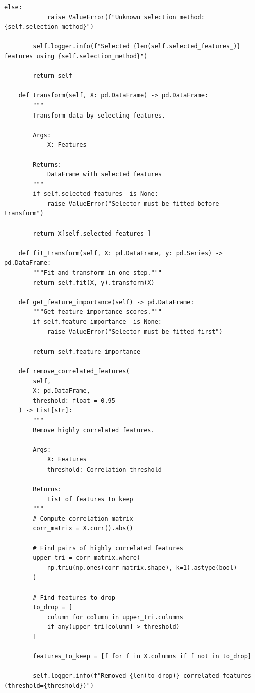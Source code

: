 \begin{lstlisting}[style=python, caption={Comprehensive Feature Selection Framework}]
        else:
            raise ValueError(f"Unknown selection method: {self.selection_method}")

        self.logger.info(f"Selected {len(self.selected_features_)} features using {self.selection_method}")

        return self

    def transform(self, X: pd.DataFrame) -> pd.DataFrame:
        """
        Transform data by selecting features.

        Args:
            X: Features

        Returns:
            DataFrame with selected features
        """
        if self.selected_features_ is None:
            raise ValueError("Selector must be fitted before transform")

        return X[self.selected_features_]

    def fit_transform(self, X: pd.DataFrame, y: pd.Series) -> pd.DataFrame:
        """Fit and transform in one step."""
        return self.fit(X, y).transform(X)

    def get_feature_importance(self) -> pd.DataFrame:
        """Get feature importance scores."""
        if self.feature_importance_ is None:
            raise ValueError("Selector must be fitted first")

        return self.feature_importance_

    def remove_correlated_features(
        self,
        X: pd.DataFrame,
        threshold: float = 0.95
    ) -> List[str]:
        """
        Remove highly correlated features.

        Args:
            X: Features
            threshold: Correlation threshold

        Returns:
            List of features to keep
        """
        # Compute correlation matrix
        corr_matrix = X.corr().abs()

        # Find pairs of highly correlated features
        upper_tri = corr_matrix.where(
            np.triu(np.ones(corr_matrix.shape), k=1).astype(bool)
        )

        # Find features to drop
        to_drop = [
            column for column in upper_tri.columns
            if any(upper_tri[column] > threshold)
        ]

        features_to_keep = [f for f in X.columns if f not in to_drop]

        self.logger.info(f"Removed {len(to_drop)} correlated features (threshold={threshold})")


\end{lstlisting}
